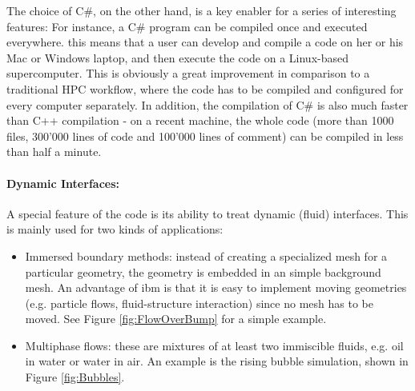 \documentclass[a4paper,10pt]{report} %
\begin{document}
The choice of C\#, on the other hand, is a key enabler for a series of interesting features:
For instance, a C\# program can be compiled once and executed everywhere. this means that a user can
develop and compile a code on her or his Mac or Windows laptop, and then execute
the code on a Linux-based supercomputer. This is obviously a great improvement
in comparison to a traditional HPC workflow, where the code has to be compiled and configured
for every computer separately. In addition, the compilation of C\# is also much faster than
C++ compilation - on a recent machine, the whole \BoSSS{} code
(more than 1000 files, 300'000 lines of code and 100'000 lines of comment)
can be compiled in less than half a minute.




\paragraph{Dynamic Interfaces:} 
A special feature of the \BoSSS{} code is its ability to treat dynamic (fluid) interfaces.
This is mainly used for two kinds of applications:
\begin{itemize}
\item
Immersed boundary methods: instead of creating a specialized mesh for a particular geometry,
the geometry is embedded in an simple background mesh.
An advantage of \ac{ibm} is that it is easy to implement moving geometries
(e.g. particle flows, fluid-structure interaction) since no mesh has to be moved.
See Figure \ref{fig:FlowOverBump} for a simple example.

\item
Multiphase flows: these are mixtures of at least two immiscible fluids, 
e.g. oil in water or water in air.
An example is the rising bubble simulation, shown in Figure \ref{fig:Bubbles}.

\end{itemize}
\end{document}
